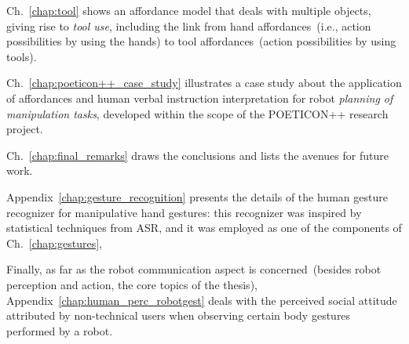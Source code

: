 Ch.~\ref{chap:tool} shows an affordance model that deals with multiple objects, giving rise to \emph{tool use}, including the link from hand affordances~(i.e., action possibilities by using the hands) to tool affordances~(action possibilities by using tools).

Ch.~\ref{chap:poeticon++_case_study} illustrates a case study about the application of affordances and human verbal instruction interpretation for robot \emph{planning of manipulation tasks}, developed within the scope of the POETICON++ research project.

Ch.~\ref{chap:final_remarks} draws the conclusions and lists the avenues for future work.

Appendix~\ref{chap:gesture_recognition} presents the details of the human gesture recognizer for manipulative hand gestures: this recognizer was inspired by statistical techniques from \ac{ASR}, and it was employed as one of the components of Ch.~\ref{chap:gestures},

Finally, as far as the robot communication aspect is concerned~(besides robot perception and action, the core topics of the thesis),
Appendix~\ref{chap:human_perc_robotgest} deals with the perceived social attitude attributed by non-technical users when observing certain body gestures performed by a robot.
